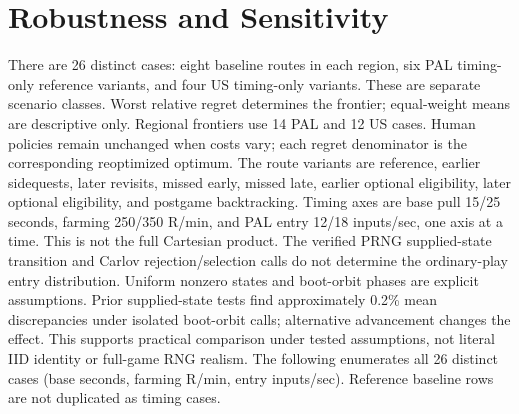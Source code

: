 \documentclass[11pt]{article}
\theoremstyle{definition}\newtheorem{definition}[theorem]{Definition}
\begin{document}
\section{Robustness and Sensitivity}
There are 26 distinct cases: eight baseline routes in each region, six PAL timing-only reference variants, and four US timing-only variants. These are separate scenario classes. Worst relative regret determines the frontier; equal-weight means are descriptive only. Regional frontiers use 14 PAL and 12 US cases. Human policies remain unchanged when costs vary; each regret denominator is the corresponding reoptimized optimum.
The route variants are reference, earlier sidequests, later revisits, missed early, missed late, earlier optional eligibility, later optional eligibility, and postgame backtracking. Timing axes are base pull 15/25 seconds, farming 250/350 R/min, and PAL entry 12/18 inputs/sec, one axis at a time. This is not the full Cartesian product.
The verified PRNG supplied-state transition and Carlov rejection/selection calls do not determine the ordinary-play entry distribution. Uniform nonzero states and boot-orbit phases are explicit assumptions. Prior supplied-state tests find approximately 0.2\% mean discrepancies under isolated boot-orbit calls; alternative advancement changes the effect. This supports practical comparison under tested assumptions, not literal IID identity or full-game RNG realism.
The following enumerates all 26 distinct cases (base seconds, farming R/min, entry inputs/sec). Reference baseline rows are not duplicated as timing cases.
\end{document}
